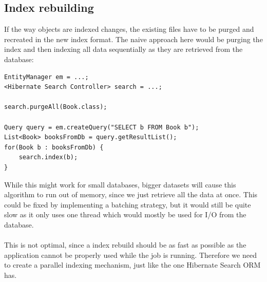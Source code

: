 \subsection{Index rebuilding}
If the way objects are indexed changes, the existing files have to be purged and recreated in the new index format. The naive approach here would be purging the index and then indexing all data sequentially as they are retrieved from the database:
\\
\lstset{language=java}
\begin{lstlisting}[frame=htrbl, caption={naive index rebuilding}, label={lst:naiveIndexing}]
EntityManager em = ...;
<Hibernate Search Controller> search = ...;

search.purgeAll(Book.class);

Query query = em.createQuery("SELECT b FROM Book b");
List<Book> booksFromDb = query.getResultList();
for(Book b : booksFromDb) {
	search.index(b);
}
\end{lstlisting}
While this might work for small databases, bigger datasets will cause this algorithm to run out of memory, since we just retrieve all the data at once. This could be fixed by implementing a batching strategy, but it would still be quite slow as it only uses one thread which would mostly be used for I/O from the database.
\\\\
This is not optimal, since a index rebuild should be as fast as possible as the application cannot be properly used while the job is running. Therefore we need to create a parallel indexing mechanism, just like the one Hibernate Search ORM has.

